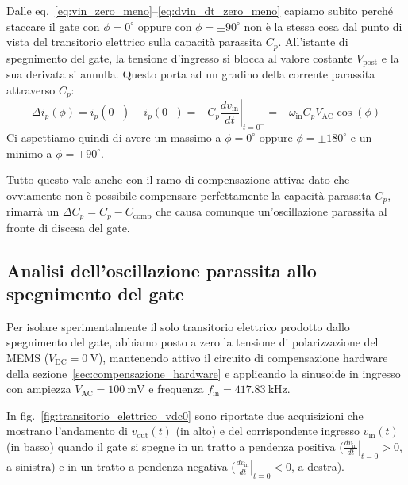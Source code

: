 \documentclass[11pt,a4paper]{article}
\begin{document}
\noindent Dalle eq.~\eqref{eq:vin_zero_meno}--\eqref{eq:dvin_dt_zero_meno} capiamo subito perché staccare il gate con $\phi = 0^\circ$ oppure con $\phi = \pm 90^\circ$ non è la stessa cosa dal punto di vista del transitorio elettrico sulla capacità parassita $C_p$. All'istante di spegnimento del gate, la tensione d'ingresso si blocca al valore costante $V_{\text{post}}$ e la sua derivata si annulla. Questo porta ad un gradino della corrente parassita attraverso $C_p$:
\begin{equation}
    \label{eq:salto_corrente_cp}
    \Delta i_p(\phi) = i_p(0^+) - i_p(0^-) = -C_p \left.\frac{dv_{\text{in}}}{dt}\right|_{t=0^-} = -\omega_{\text{in}} C_p V_{\text{AC}} \cos(\phi)
\end{equation}
Ci aspettiamo quindi di avere un massimo a $\phi = 0^\circ$ oppure $\phi = \pm 180^\circ$ e un minimo a $\phi = \pm 90^\circ$.

\vspace{0.3cm}
\noindent Tutto questo vale anche con il ramo di compensazione attiva: dato che ovviamente non è possibile compensare perfettamente la capacità parassita $C_p$, rimarrà un $\Delta C_p = C_p - C_{\text{comp}}$ che causa comunque un'oscillazione parassita al fronte di discesa del gate.

\newpage
\subsection{Analisi dell'oscillazione parassita allo spegnimento del gate}
\label{subsec:oscillazione_parassita_gate}

Per isolare sperimentalmente il solo transitorio elettrico prodotto dallo spegnimento del gate, abbiamo posto a zero la tensione di polarizzazione del MEMS ($V_{\text{DC}} = \SI{0}{\volt}$), mantenendo attivo il circuito di compensazione hardware della sezione~\ref{sec:compensazione_hardware} e applicando la sinusoide in ingresso con ampiezza $V_{\text{AC}} = \SI{100}{\milli\volt}$ e frequenza $f_{\text{in}} = \SI{417.83}{\kilo\hertz}$.

\vspace{0.3cm}
\noindent In fig.~\ref{fig:transitorio_elettrico_vdc0} sono riportate due acquisizioni che mostrano l'andamento di $v_{\text{out}}(t)$ (in alto) e del corrispondente ingresso $v_{\text{in}}(t)$ (in basso) quando il gate si spegne in un tratto a pendenza positiva ($\left.\frac{dv_{\text{in}}}{dt}\right|_{t=0} > 0$, a sinistra) e in un tratto a pendenza negativa ($\left.\frac{dv_{\text{in}}}{dt}\right|_{t=0} < 0$, a destra).
\end{document}

